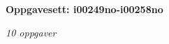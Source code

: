 \centerline{\bf Oppgavesett: i00249no-i00258no}
\vskip 10pt
\centerline{\it 10 oppgaver}\vskip 10pt
\vskip 10pt
